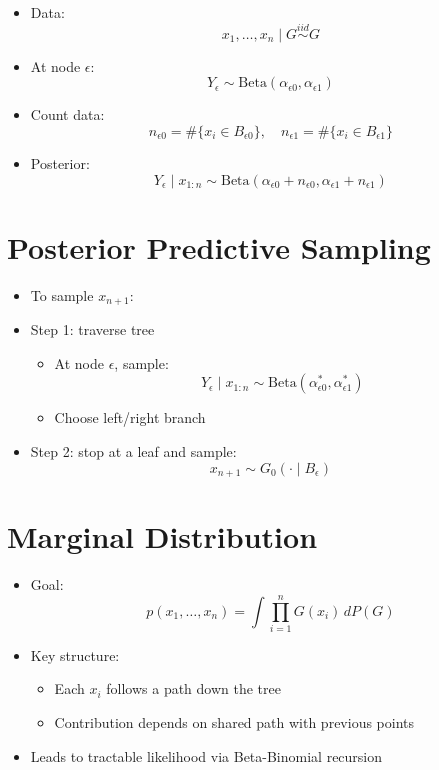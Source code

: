\documentclass[12pt,oneside]{book}
\numberwithin{equation}{section}
\theoremstyle{definition}
\theoremstyle{plain}
\theoremstyle{remark}
\begin{document}
\begin{itemize}
\item Data:
\[
x_1,\dots,x_n \mid G \stackrel{iid}{\sim} G
\]

\item At node $\epsilon$:
\[
Y_\epsilon \sim \text{Beta}(\alpha_{\epsilon 0}, \alpha_{\epsilon 1})
\]

\item Count data:
\[
n_{\epsilon 0} = \#\{x_i \in B_{\epsilon 0}\}, \quad
n_{\epsilon 1} = \#\{x_i \in B_{\epsilon 1}\}
\]

\item Posterior:
\[
Y_\epsilon \mid x_{1:n}
\sim
\text{Beta}(\alpha_{\epsilon 0} + n_{\epsilon 0}, \alpha_{\epsilon 1} + n_{\epsilon 1})
\]
\end{itemize}

\section{Posterior Predictive Sampling}

\begin{itemize}
\item To sample $x_{n+1}$:

\item Step 1: traverse tree

\begin{itemize}
\item At node $\epsilon$, sample:
\[
Y_\epsilon \mid x_{1:n} \sim \text{Beta}(\alpha_{\epsilon 0}^*, \alpha_{\epsilon 1}^*)
\]
\item Choose left/right branch
\end{itemize}

\item Step 2: stop at a leaf and sample:
\[
x_{n+1} \sim G_0(\cdot \mid B_\epsilon)
\]
\end{itemize}

\section{Marginal Distribution}

\begin{itemize}
\item Goal:
\[
p(x_1,\dots,x_n) = \int \prod_{i=1}^n G(x_i)\, dP(G)
\]

\item Key structure:

\begin{itemize}
\item Each $x_i$ follows a path down the tree
\item Contribution depends on shared path with previous points
\end{itemize}

\item Leads to tractable likelihood via Beta-Binomial recursion
\end{itemize}
\end{document}

